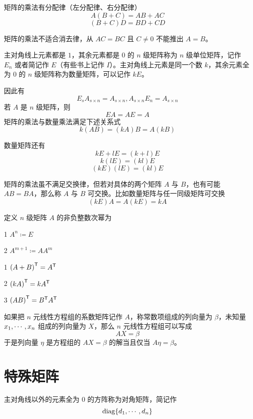 \begin{theorem}
    矩阵的乘法有分配律（左分配律、右分配律）
    \[A(B+C) = AB+AC\]
    \[(B+C)D = BD + CD\]
\end{theorem}

矩阵的乘法不适合消去律，从 $AC = BC$ 且 $C\ne 0$ 不能推出 $A=B$。

主对角线上元素都是 $1$，其余元素都是 $0$ 的 $n$ 级矩阵称为 $n$ 级单位矩阵，记作 $E_n$ 或者简记作 $E$（有些书上记作 $I$）。主对角线上元素是同一个数 $k$，其余元素全为 $0$ 的 $n$ 级矩阵称为数量矩阵，可以记作 $kE$。

因此有
\[E_s A_{s \times n} = A_{s \times n}, A_{s \times n} E_n= A_{s \times n}\]
若 $A$ 是 $n$ 级矩阵，则
\[EA = AE = A\]
矩阵的乘法与数量乘法满足下述关系式
\[k(AB) = (kA)B = A(kB)\]

数量矩阵还有
\[kE + lE = (k+l)E\]
\[k(lE) = (kl)E\]
\[(kE)(lE) = (kl)E\]

矩阵的乘法虽不满足交换律，但若对具体的两个矩阵 $A$ 与 $B$，也有可能 $AB = BA$，那么称 $A$ 与 $B$ 可交换。比如数量矩阵与任一同级矩阵可交换
\[(kE)A = A(kE) = kA\]

\begin{definition}
    定义 $n$ 级矩阵 $A$ 的非负整数次幂为

    \num{1} $A^n \coloneqq  E$

    \num{2} $A^{m+1} \coloneqq  AA^m$
\end{definition}


\begin{theorem}
    \num{1} ${(A+B)}^\mathsf{T} = {A}^\mathsf{T}$
    
    \num{2} ${(kA)}^\mathsf{T} = k{A}^\mathsf{T}$
    
    \num{3} ${(AB)}^\mathsf{T} = {B}^\mathsf{T}{A}^\mathsf{T}$
\end{theorem}

如果把 $n$ 元线性方程组的系数矩阵记作 $A$，称常数项组成的列向量为 $\beta$，未知量 $x_1,\cdots,x_n$ 组成的列向量为 $X$，那么 $n$ 元线性方程组可以写成
\[AX = \beta\]
于是列向量 $\eta$ 是方程组的 $AX = \beta$ 的解当且仅当 $A\eta = \beta$。

\section{特殊矩阵}

\begin{definition}
    主对角线以外的元素全为 $0$ 的方阵称为对角矩阵，简记作
    \[\operatorname{diag}\{d_1,\cdots,d_n\}\]
\end{definition}


